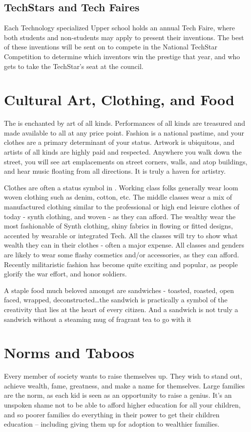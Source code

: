 \documentclass[blue]{GL2020}
\begin{document}
\subsection{TechStars and Tech Faires}
Each Technology specialized Upper school holds an annual Tech Faire, where both students and non-students may apply to present their inventions. The best of these inventions will be sent on to compete in the National TechStar Competition to determine which inventors win the prestige that year, and who gets to take the TechStar’s seat at the council.

\section*{Cultural Art, Clothing, and Food}
The \pTech{} is enchanted by art of all kinds. Performances of all kinds are treasured and made available to all at any price point. Fashion is a national pastime, and your clothes are a primary determinant of your status. Artwork is ubiquitous, and artists of all kinds are highly paid and respected. Anywhere you walk down the street, you will see art emplacements on street corners, walls, and atop buildings, and hear music floating from all directions. It is truly a haven for artistry.

Clothes are often a status symbol in \pTech{}.  Working class folks generally wear loom woven clothing such as denim, cotton, etc.  The middle classes wear a mix of manufactured clothing similar to the professional or high end leisure clothes of today - synth clothing, and woven - as they can afford.  The wealthy wear the most fashionable of Synth clothing, shiny fabrics in flowing or fitted designs, accented by wearable or integrated Tech.  All the classes will try to show what wealth they can in their clothes - often a major expense.  All classes and genders are likely to wear some flashy cosmetics and/or accessories, as they can afford.  Recently militaristic fashion has become quite exciting and popular, as people glorify the war effort, and honor soldiers.

A staple food much beloved amongst \pTech{} are sandwiches - toasted, roasted, open faced, wrapped, deconstructed\ldots the sandwich is practically a symbol of the creativity that lies at the heart of every citizen.  And a sandwich is not truly a sandwich without a steaming mug of fragrant tea to go with it

\section*{Norms and Taboos}
Every member of \pTech{} society wants to raise themselves up. They wish to stand out, achieve wealth, fame, greatness, and make a name for themselves. Large families are the norm, as each kid is seen as an opportunity to raise a genius. It's an unspoken shame not to be able to afford higher education for all your children, and so poorer families do everything in their power to get their children education -- including giving them up for adoption to wealthier families.  
\end{document}
